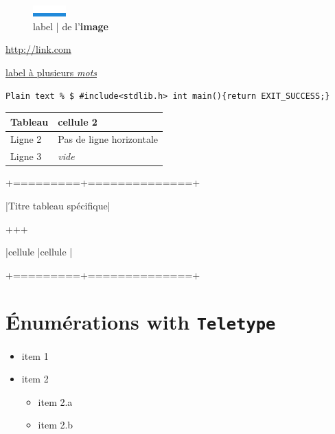 \documentclass{article}
\begin{document}
		\begin{figure}[h!]
			\centering
			\includegraphics[scale=10.000000]{image.png}
			\caption{label | de l'\textbf{image} }
		\end{figure}

		\url{http://link.com}

		\href{http://link.com/}{label à plusieurs \textit{mots}}

		\verb?Plain text % $ #include<stdlib.h> int main(){return EXIT_SUCCESS;}?

		

		

		\begin{tabular}{|l|l|}
			\hline
			\textbf{Tableau} & cellule 2\\
			\hline
			Ligne 2 & Pas de ligne horizontale\\
			Ligne 3 & \textit{vide}\\
			\hline
		\end{tabular}

		


		

		+=========+==============+

		|Titre tableau spécifique|

		+\textendash \textendash \textendash \textendash \textendash \textendash \textendash \textendash \textendash +\textendash \textendash \textendash \textendash \textendash \textendash \textendash \textendash \textendash \textendash \textendash \textendash \textendash \textendash +

		|cellule  |cellule       |

		+=========+==============+

		

		\section{Énumérations with \texttt{Teletype}}

			\begin{itemize}[label=$\bullet$]
				\item item 1
				\item item 2
					\begin{itemize}[label=$\bullet$]
						\item item 2.a
						\item item 2.b
					\end{itemize}
			\end{itemize}
\end{document}
